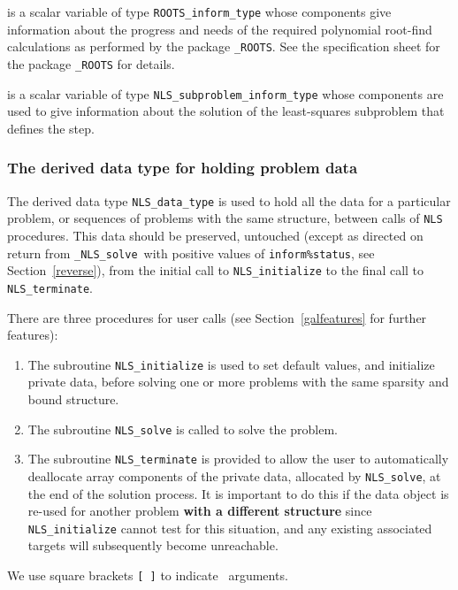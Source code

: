 \documentclass{galahad}
\newcommand{\packagename}{NLS}
\newcommand{\fullpackagename}{\libraryname\_\packagename}
\newcommand{\solver}{{\tt \fullpackagename\_solve}}
\begin{document}
\begin{description}
 is a scalar variable of type
{\tt ROOTS\_inform\_type}
whose components give information about the progress and needs
of the required polynomial root-find calculations
as performed by the package
{\tt \libraryname\_ROOTS}.
See the specification sheet for the package
{\tt \libraryname\_ROOTS} for details.

  is a scalar variable of type
{\tt \packagename\_subproblem\_inform\_type}
whose components are used to give information about the solution of the
least-squares subproblem that defines the step.
\end{description}


\subsubsection{The derived data type for holding problem data}\label{typedata}
The derived data type
{\tt \packagename\_data\_type}
is used to hold all the data for a particular problem,
or sequences of problems with the same structure, between calls of
{\tt \packagename} procedures.
This data should be preserved, untouched (except as directed on
return from \solver\ with positive values of {\tt inform\%status}, see
Section~\ref{reverse}),
from the initial call to
{\tt \packagename\_initialize}
to the final call to
{\tt \packagename\_terminate}.





\galarguments
There are three procedures for user calls
(see Section~\ref{galfeatures} for further features):

\begin{enumerate}
\item The subroutine
      {\tt \packagename\_initialize}
      is used to set default values, and initialize private data,
      before solving one or more problems with the
      same sparsity and bound structure.
\item The subroutine
      {\tt \packagename\_solve}
      is called to solve the problem.
\item The subroutine
      {\tt \packagename\_terminate}
      is provided to allow the user to automatically deallocate array
       components of the private data, allocated by
       {\tt \packagename\_solve},
       at the end of the solution process.
       It is important to do this if the data object is re-used for another
       problem {\bf with a different structure}
       since {\tt \packagename\_initialize} cannot test for this situation,
       and any existing associated targets will subsequently become unreachable.
\end{enumerate}
We use square brackets {\tt [ ]} to indicate \optional\ arguments.
\end{document}
